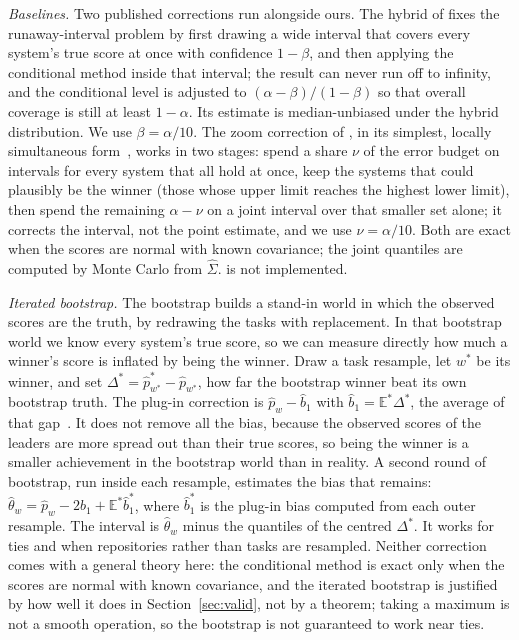 \documentclass[11pt]{article}
\renewcommand{\hat}{\widehat}
\newcommand{\E}{\mathbb{E}}
\begin{document}
\emph{Baselines.}
Two published corrections run alongside ours.
The hybrid of \citet{andrews2024winners} fixes the runaway-interval problem by first drawing a wide interval that covers every system's true score at once with confidence $1-\beta$, and then applying the conditional method inside that interval; the result can never run off to infinity, and the conditional level is adjusted to $(\alpha-\beta)/(1-\beta)$ so that overall coverage is still at least $1-\alpha$. Its estimate is median-unbiased under the hybrid distribution. We use $\beta=\alpha/10$.
The zoom correction of \citet{zrnic2025flexible}, in its simplest, locally simultaneous form~\citep{zrnic2024locally}, works in two stages: spend a share $\nu$ of the error budget on intervals for every system that all hold at once, keep the systems that could plausibly be the winner (those whose upper limit reaches the highest lower limit), then spend the remaining $\alpha-\nu$ on a joint interval over that smaller set alone; it corrects the interval, not the point estimate, and we use $\nu=\alpha/10$.
Both are exact when the scores are normal with known covariance; the joint quantiles are computed by Monte Carlo from $\hat\Sigma$.
\citet{hoff2025selective} is not implemented.

\emph{Iterated bootstrap.}
The bootstrap builds a stand-in world in which the observed scores are the truth, by redrawing the tasks with replacement.
In that bootstrap world we know every system's true score, so we can measure directly how much a winner's score is inflated by being the winner.
Draw a task resample, let $w^*$ be its winner, and set $\Delta^*=\hat p^*_{w^*}-\hat p_{w^*}$, how far the bootstrap winner beat its own bootstrap truth.
The plug-in correction is $\hat p_w-\hat b_1$ with $\hat b_1=\E^*\Delta^*$, the average of that gap~\citep{efron1993bootstrap,efron2014model}.
It does not remove all the bias, because the observed scores of the leaders are more spread out than their true scores, so being the winner is a smaller achievement in the bootstrap world than in reality.
A second round of bootstrap, run inside each resample, estimates the bias that remains: $\hat\theta_w=\hat p_w-2\hat b_1+\E^*\hat b_1^*$, where $\hat b_1^*$ is the plug-in bias computed from each outer resample.
The interval is $\hat\theta_w$ minus the quantiles of the centred $\Delta^*$.
It works for ties and when repositories rather than tasks are resampled.
Neither correction comes with a general theory here: the conditional method is exact only when the scores are normal with known covariance, and the iterated bootstrap is justified by how well it does in Section~\ref{sec:valid}, not by a theorem; taking a maximum is not a smooth operation, so the bootstrap is not guaranteed to work near ties.
\end{document}
